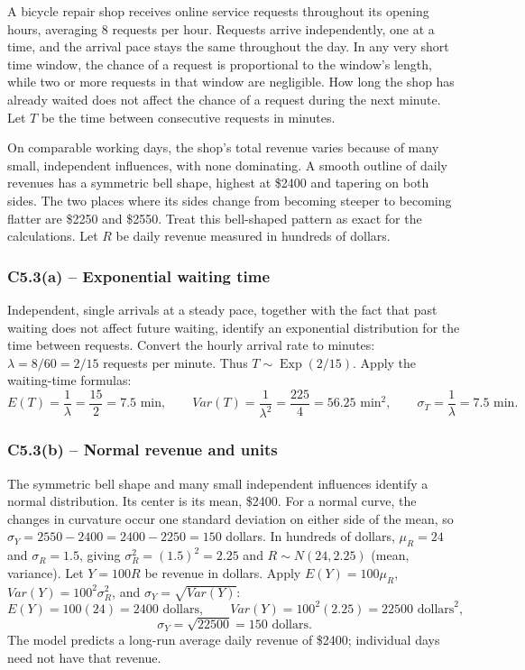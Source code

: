 {
A bicycle repair shop receives online service requests throughout its opening
hours, averaging 8 requests per hour. Requests arrive independently, one at
a time, and the arrival pace stays the same throughout the day. In any very
short time window, the chance of a request is proportional to the window's
length, while two or more requests in that window are negligible. How long
the shop has already waited does not affect the chance of a request during
the next minute. Let $T$ be the time between consecutive requests in minutes.

On comparable working days, the shop's total revenue varies because of many
small, independent influences, with none dominating. A smooth outline of
daily revenues has a symmetric bell shape, highest at \$2400 and tapering
on both sides. The two places where its sides change from becoming steeper
to becoming flatter are \$2250 and \$2550. Treat this bell-shaped pattern
as exact for the calculations. Let $R$ be daily revenue measured in hundreds
of dollars.
\label{sol:c5-3a}
\subsubsection*{C5.3(a) -- Exponential waiting time }
Independent, single arrivals at a steady pace, together with the fact that
past waiting does not affect future waiting, identify an exponential
distribution for the time between requests. Convert the hourly arrival rate
to minutes: $\lambda=8/60=2/15$ requests per minute.
Thus $T\sim\operatorname{Exp}(2/15)$. Apply the waiting-time formulas:
\[
E(T)=\frac{1}{\lambda}=\frac{15}{2}=7.5\text{ min},\qquad
Var(T)=\frac{1}{\lambda^2}=\frac{225}{4}=56.25\text{ min}^2,
\qquad \sigma_T=\frac{1}{\lambda}=7.5\text{ min}.
\]
\label{sol:c5-3b}
\subsubsection*{C5.3(b) -- Normal revenue and units }
The symmetric bell shape and many small independent influences identify a
normal distribution. Its center is its mean, \$2400. For a normal curve,
the changes in curvature occur one standard deviation on either side of
the mean, so $\sigma_Y=2550-2400=2400-2250=150$ dollars.
In hundreds of dollars, $\mu_R=24$ and $\sigma_R=1.5$, giving
$\sigma_R^2=(1.5)^2=2.25$ and $R\sim N(24,2.25)$ (mean, variance).
Let $Y=100R$ be revenue in dollars. Apply
$E(Y)=100\mu_R$, $Var(Y)=100^2\sigma_R^2$, and
$\sigma_Y=\sqrt{Var(Y)}$:
\[
E(Y)=100(24)=2400\text{ dollars},\qquad
Var(Y)=100^2(2.25)=22500\text{ dollars}^2,
\]
\[
\sigma_Y=\sqrt{22500}=150\text{ dollars}.
\]
The model predicts a long-run average daily revenue of \$2400; individual
days need not have that revenue.
\secInicio[sec:c5-3]
}

